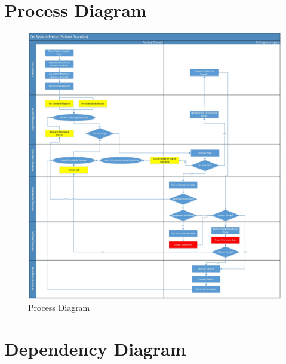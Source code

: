 \documentclass[paper=letter, fontsize=10pt]{scrartcl}
\numberwithin{equation}{section}		%
\numberwithin{figure}{section}			%
\numberwithin{table}{section}				%
\begin{document}
\section{Process Diagram}
\begin{figure}[h!]
	\begin{center}
		\includegraphics[width=1\columnwidth]{../Process_Diagrams/Process_Diagram.jpg}
		\caption{Process Diagram}
	\end{center}
\end{figure}
\newpage
\section{Dependency Diagram}
\end{document}
